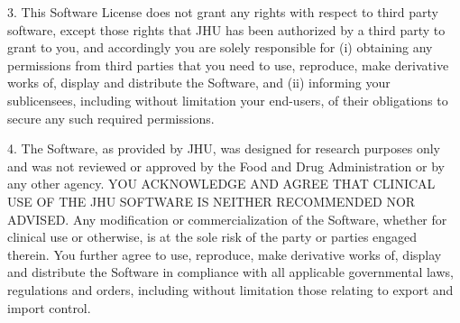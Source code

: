 \begin{DoxyPre}3. This Software License does not grant any rights with respect to
   third party software, except those rights that JHU has been
   authorized by a third party to grant to you, and accordingly you
   are solely responsible for (i) obtaining any permissions from third
   parties that you need to use, reproduce, make derivative works of,
   display and distribute the Software, and (ii) informing your
   sublicensees, including without limitation your end-users, of their
   obligations to secure any such required permissions.\end{DoxyPre}



\begin{DoxyPre}4. The Software, as provided by JHU, was designed for research
   purposes only and was not reviewed or approved by the Food and Drug
   Administration or by any other agency. YOU ACKNOWLEDGE AND AGREE
   THAT CLINICAL USE OF THE JHU SOFTWARE IS NEITHER RECOMMENDED NOR
   ADVISED. Any modification or commercialization of the Software,
   whether for clinical use or otherwise, is at the sole risk of the
   party or parties engaged therein. You further agree to use,
   reproduce, make derivative works of, display and distribute the
   Software in compliance with all applicable governmental laws,
   regulations and orders, including without limitation those relating
   to export and import control.\end{DoxyPre}




